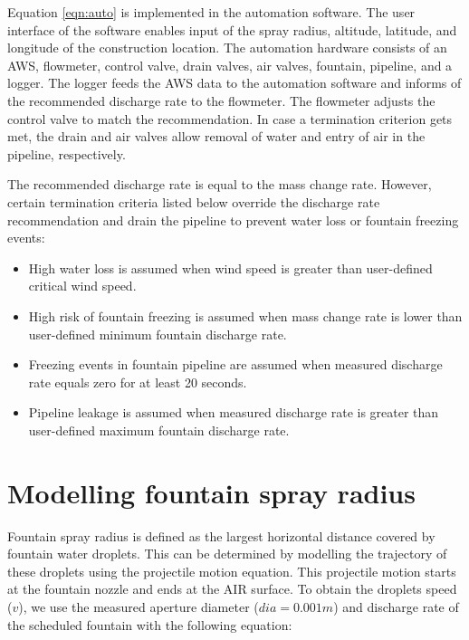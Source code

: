 \documentclass[tc, manuscript]{copernicus}
\begin{document}
Equation \ref{eqn:auto} is implemented in the automation software. The user interface of the software enables
input of the spray radius, altitude, latitude, and longitude of the construction location. The automation
hardware consists of an AWS, flowmeter, control valve, drain valves, air valves, fountain, pipeline, and a
logger. The logger feeds the AWS data to the automation software and informs of the recommended discharge rate to
the flowmeter. The flowmeter adjusts the control valve to match the recommendation. In case a termination
criterion gets met, the drain and air valves allow removal of water and entry of
air in the pipeline, respectively.

The recommended discharge rate is equal to the mass change rate. However, certain termination criteria listed
below override the discharge rate recommendation and drain the pipeline to prevent water loss or fountain
freezing events:

\begin{itemize}

\item High water loss is assumed when wind speed is greater than user-defined critical wind speed.

\item High risk of fountain freezing is assumed when mass change rate is lower than user-defined minimum fountain discharge rate. 

\item Freezing events in fountain pipeline are assumed when measured discharge rate equals zero for at least 20
  seconds. 

\item Pipeline leakage is assumed when measured discharge rate is greater than user-defined maximum fountain discharge rate.

\end{itemize}

\section{Modelling fountain spray radius} \label{sec:r_F}

Fountain spray radius is defined as the largest horizontal distance covered by fountain water droplets. This
can be determined by modelling the trajectory of these droplets using the projectile motion equation. This
projectile motion starts at the fountain nozzle and ends at the AIR surface.  To obtain the droplets speed
($v$), we use the measured aperture diameter ($dia = 0.001 m$) and discharge rate of the scheduled fountain
with the following equation:
\end{document}
